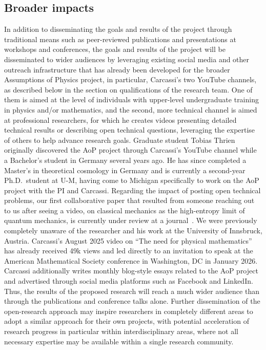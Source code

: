 \subsection{Broader impacts}
In addition to disseminating the goals and results of the project through traditional means such as peer-reviewed publications and presentations at workshops and conferences, the goals and results of the project will be disseminated to wider audiences by leveraging existing social media and other outreach infrastructure that has already been developed for the broader Assumptions of Physics project, in particular, Carcassi's two YouTube channels, as described below in the section on qualifications of the research team.  One of them is aimed at the level of individuals with upper-level undergraduate training in physics and/or mathematics, and the second, more technical channel is aimed at professional researchers, for which he creates videos presenting detailed technical results or describing open technical questions, leveraging the expertise of others to help advance research goals.  Graduate student Tobias Thrien originally discovered the AoP project through Carcassi's YouTube channel while a Bachelor's student in Germany several years ago.  He has since completed a Master's in theoretical cosmology in Germany and is currently a second-year Ph.D.~student at U-M, having come to Michigan specifically to work on the AoP project with the PI and Carcassi.  Regarding the impact of posting open technical problems, our first collaborative paper that resulted from someone reaching out to us after seeing a video, on classical mechanics as the high-entropy limit of quantum mechanics, is currently under review at a journal~\cite{aop-classicallimit}.  We were previously completely unaware of the researcher and his work at the University of Innsbruck, Austria. Carcassi's August 2025 video on ``The need for physical mathematics'' has already received 49k views and led directly to an invitation to speak at the American Mathematical Society conference in Washington, DC in January 2026. Carcassi additionally writes monthly blog-style essays related to the AoP project and advertised through social media platforms such as Facebook and LinkedIn.  Thus, the results of the proposed research will reach a much wider audience than through the publications and conference talks alone.  Further dissemination of the open-research approach may inspire researchers in completely different areas to adopt a similar approach for their own projects, with potential acceleration of research progress in particular within interdisciplinary areas, where not all necessary expertise may be available within a single research community.  

